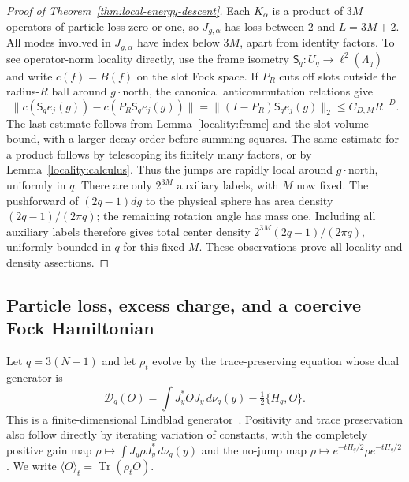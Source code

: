 \begin{proof}[Proof of Theorem~\ref{thm:local-energy-descent}]
Each $K_\alpha$ is a product of $3M$ operators of particle loss zero or
one, so $J_{g,\alpha}$ has loss between $2$ and $L=3M+2$.
All modes involved in $J_{g,\alpha}$ have index below $3M$, apart from
identity factors.  To see operator-norm locality directly, use the frame
isometry $\mathsf S_q:U_q\to\ell^2(\Lambda_q)$ and write $c(f)=B(f)$ on the slot
Fock space.  If $P_R$ cuts off slots outside the radius-$R$ ball around
$g\cdot\mathrm{north}$, the canonical anticommutation relations give
\[
 \|c(\mathsf S_qe_j(g))-c(P_R\mathsf S_qe_j(g))\|
   =\|(I-P_R)\mathsf S_qe_j(g)\|_2\le C_{D,M}R^{-D}.
\]
The last estimate follows from Lemma~\ref{locality:frame} and the slot
volume bound, with a larger decay order before summing squares.
The same estimate for a product follows by telescoping its finitely many
factors, or by Lemma~\ref{locality:calculus}.  Thus the jumps are rapidly
local around $g\cdot\mathrm{north}$, uniformly in $q$.
There are only $2^{3M}$ auxiliary labels, with $M$ now fixed.
The pushforward of $(2q-1)dg$ to the physical sphere has area density
$(2q-1)/(2\pi q)$; the remaining rotation angle has mass one.
Including all auxiliary labels therefore gives total center density
$2^{3M}(2q-1)/(2\pi q)$, uniformly bounded in $q$ for this fixed $M$.
These observations prove all locality and density assertions.
\end{proof}

\subsection{Particle loss, excess charge, and a coercive Fock Hamiltonian}

Let $q=3(N-1)$ and let $\rho_t$ evolve by the trace-preserving equation
whose dual generator is
\begin{equation}\label{eq:loss-generator}
 \mathcal D_q(O)=\int J_y^*OJ_y\,d\nu_q(y)-\tfrac12\{H_q,O\}.
\end{equation}
This is a finite-dimensional Lindblad generator~\cite{Lindblad}.  Positivity and trace
preservation also follow directly by iterating variation of constants,
with the completely positive gain map
$\rho\mapsto\int J_y\rho J_y^*\,d\nu_q(y)$ and the no-jump map
$\rho\mapsto e^{-tH_q/2}\rho e^{-tH_q/2}$.
We write $\langle O\rangle_t=\operatorname{Tr}(\rho_tO)$.


